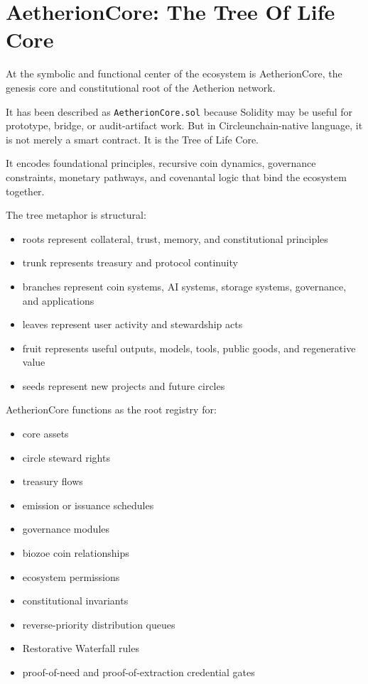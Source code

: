 ﻿\documentclass[12pt]{article}
\begin{document}
\section{AetherionCore: The Tree Of Life Core}


At the symbolic and functional center of the ecosystem is AetherionCore, the genesis core and constitutional root of the Aetherion network.

It has been described as \texttt{AetherionCore.sol} because Solidity may be useful for prototype, bridge, or audit-artifact work. But in Circleunchain-native language, it is not merely a smart contract. It is the Tree of Life Core.

It encodes foundational principles, recursive coin dynamics, governance constraints, monetary pathways, and covenantal logic that bind the ecosystem together.

The tree metaphor is structural:

\begin{itemize}
  \item roots represent collateral, trust, memory, and constitutional principles
  \item trunk represents treasury and protocol continuity
  \item branches represent coin systems, AI systems, storage systems, governance, and applications
  \item leaves represent user activity and stewardship acts
  \item fruit represents useful outputs, models, tools, public goods, and regenerative value
  \item seeds represent new projects and future circles
\end{itemize}

AetherionCore functions as the root registry for:

\begin{itemize}
  \item core assets
  \item circle steward rights
  \item treasury flows
  \item emission or issuance schedules
  \item governance modules
  \item biozoe coin relationships
  \item ecosystem permissions
  \item constitutional invariants
  \item reverse-priority distribution queues
  \item Restorative Waterfall rules
  \item proof-of-need and proof-of-extraction credential gates
\end{itemize}
\end{document}

